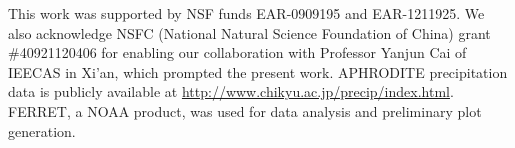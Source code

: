 \documentclass[draft,grl]{AGUTeX}
\begin{document}
\begin{article}

\begin{acknowledgments}
This work was supported by NSF funds EAR-0909195 and EAR-1211925. We also acknowledge NSFC (National Natural Science Foundation of China) grant \#40921120406 for enabling our collaboration with Professor Yanjun Cai of IEECAS in Xi'an, which prompted the present work. APHRODITE precipitation data is publicly available at \url{http://www.chikyu.ac.jp/precip/index.html}. FERRET, a NOAA product, was used for data analysis and preliminary plot generation.
\end{acknowledgments}




%
%
\end{article}
%
%
%
%
%
\end{document}
